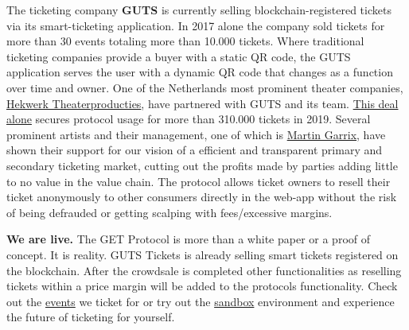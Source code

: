 \documentclass[letterpaper,10pt]{article}
\begin{document}
The ticketing company \textbf{GUTS} is currently selling blockchain-registered tickets via its smart-ticketing application. In 2017 alone the company sold tickets for more than 30 events totaling more than 10.000 tickets. Where traditional ticketing companies provide a buyer with a static QR code, the GUTS application serves the user with a dynamic QR code that changes as a function over time and owner. One of the Netherlands most prominent theater companies, \href{https://hekwerk.nl/}{\textcolor{gutsoranje}{Hekwerk Theaterproducties}}, have partnered with GUTS and its team. \href{https://blog.guts.tickets/the-hekwerk-deal-7554071b26c1}{\textcolor{gutsoranje}{This deal alone}} secures protocol usage for more than 310.000 tickets in 2019. Several prominent artists and their management, one of which is \href{https://blog.guts.tickets/advisory-board-of-get-watse-de-jong-manager-martin-garrix-nyle-budimlic-cypher-group-32ec30ce06ae}{\textcolor{gutsoranje}{Martin Garrix}}, have shown their support for our vision of a efficient and transparent primary and secondary ticketing market, cutting out the profits made by parties adding little to no value in the value chain. The protocol allows ticket owners to resell their ticket anonymously to other consumers directly in the web-app without the risk of being defrauded or getting  scalping with fees/excessive margins. 

\textbf{We are live.} The GET Protocol is more than a white paper or a proof of concept. It is reality. GUTS Tickets is already selling smart tickets registered on the blockchain. After the crowdsale is completed other functionalities as reselling tickets within a price margin will be added to the protocols functionality. Check out the \href{https://events.guts.tickets/events}{\textcolor{gutsoranje}{events}} we ticket for or try out the \href{https://sandbox.guts.tickets/events/8}{\textcolor{gutsoranje}{sandbox}} environment and experience the future of ticketing for yourself.

\end{document}
